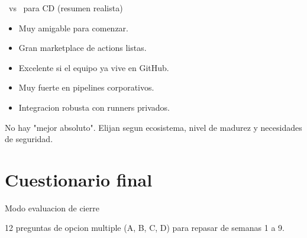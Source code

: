 \documentclass[aspectratio=169]{beamer}
\begin{document}
\begin{frame}{\faGithub\ vs \faGitlab\ para CD (resumen realista)}
	\begin{comparebox}
		\begin{darkbox}
			\begin{itemize}
				\item Muy amigable para comenzar.
				\item Gran marketplace de actions listas.
				\item Excelente si el equipo ya vive en GitHub.
			\end{itemize}
		\end{darkbox}
	\comparebreak
		\begin{darkbox}[GitLab CI]
			\begin{itemize}
				\item Muy fuerte en pipelines corporativos.
				\item Integracion robusta con runners privados.
			\end{itemize}
		\end{darkbox}
	\end{comparebox}

	\begin{alertbox}
		No hay "mejor absoluto". Elijan segun ecosistema, nivel de madurez y necesidades de seguridad.
	\end{alertbox}
\end{frame}

\section{Cuestionario final}

\begin{frame}{Modo evaluacion de cierre}
	\begin{orangebox}
		12 preguntas de opcion multiple (A, B, C, D) para repasar  de semanas 1 a 9.
	\end{orangebox}
\end{frame}
\end{document}
